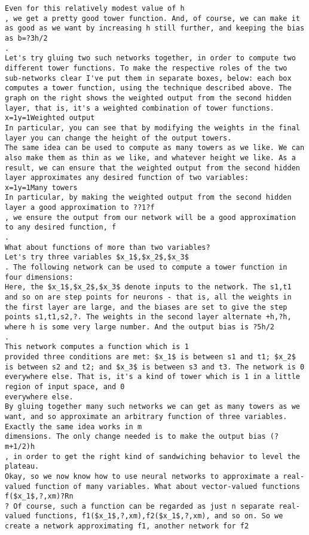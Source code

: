 \begin{lstlisting}
Even for this relatively modest value of h
, we get a pretty good tower function. And, of course, we can make it as good as we want by increasing h still further, and keeping the bias as b=?3h/2
.
Let's try gluing two such networks together, in order to compute two different tower functions. To make the respective roles of the two sub-networks clear I've put them in separate boxes, below: each box computes a tower function, using the technique described above. The graph on the right shows the weighted output from the second hidden layer, that is, it's a weighted combination of tower functions.
x=1y=1Weighted output
In particular, you can see that by modifying the weights in the final layer you can change the height of the output towers.
The same idea can be used to compute as many towers as we like. We can also make them as thin as we like, and whatever height we like. As a result, we can ensure that the weighted output from the second hidden layer approximates any desired function of two variables:
x=1y=1Many towers 
In particular, by making the weighted output from the second hidden layer a good approximation to ??1?f
, we ensure the output from our network will be a good approximation to any desired function, f
.
What about functions of more than two variables?
Let's try three variables $x_1$,$x_2$,$x_3$
. The following network can be used to compute a tower function in four dimensions:
Here, the $x_1$,$x_2$,$x_3$ denote inputs to the network. The s1,t1 and so on are step points for neurons - that is, all the weights in the first layer are large, and the biases are set to give the step points s1,t1,s2,?. The weights in the second layer alternate +h,?h, where h is some very large number. And the output bias is ?5h/2
.
This network computes a function which is 1
provided three conditions are met: $x_1$ is between s1 and t1; $x_2$ is between s2 and t2; and $x_3$ is between s3 and t3. The network is 0 everywhere else. That is, it's a kind of tower which is 1 in a little region of input space, and 0
everywhere else.
By gluing together many such networks we can get as many towers as we want, and so approximate an arbitrary function of three variables. Exactly the same idea works in m
dimensions. The only change needed is to make the output bias (?m+1/2)h
, in order to get the right kind of sandwiching behavior to level the plateau.
Okay, so we now know how to use neural networks to approximate a real-valued function of many variables. What about vector-valued functions f($x_1$,?,xm)?Rn
? Of course, such a function can be regarded as just n separate real-valued functions, f1($x_1$,?,xm),f2($x_1$,?,xm), and so on. So we create a network approximating f1, another network for f2

\end{lstlisting}
